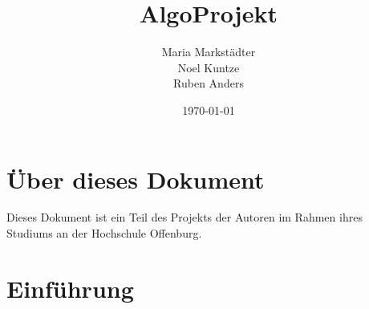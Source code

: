 \documentclass[11pt]{article}
\title{\textbf{AlgoProjekt}}
\author{Maria Markst\"adter\\
		Noel Kuntze\\
		Ruben Anders\\}
\date{\today}
\begin{document}
\maketitle
\newpage

\tableofcontents
\newpage

\section{\"Uber dieses Dokument}
Dieses Dokument ist ein Teil des Projekts der Autoren im Rahmen ihres Studiums an der Hochschule Offenburg.

\section{Einf\"uhrung}
\end{document}

